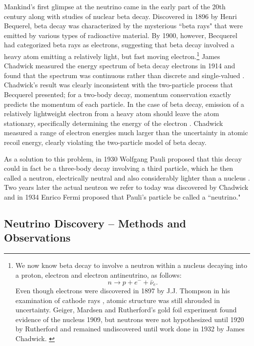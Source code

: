 Mankind's first glimpse at the neutrino came in the early part of the 20th
century along with studies of nuclear beta decay.  Discovered in 1896 by Henri
Bequerel, beta decay was characterized by the mysterious ``beta rays" that were
emitted by various types of radioactive material.  \cite{becquerelBeta}  By
1900, however, Becquerel had categorized beta rays as electrons, suggesting
that beta decay involved a heavy atom emitting a relatively light, but fast
moving electron.\footnote{
We now know beta decay to involve a neutron within a nucleus decaying into a
proton, electron and electron antineutrino, as follows:
\begin{equation*}      n \rightarrow p + e^- + \bar{\nu}_e  . \end{equation*}
Even though electrons were discovered in 1897 by J.J. Thompson in his
examination of cathode rays \cite{thompson}, atomic structure was still
shrouded in uncertainty.  Geiger, Mardsen and Rutherford's gold foil experiment
found evidence of the nucleus 1909, but neutrons were not hypothesized until
1920 by Rutherford \cite{rutherfordNeutron} and remained undiscovered until
work done in 1932 by James Chadwick. \cite{chadwickNeutron}
 } \cite{becquerelElec}
James Chadwick measured the energy spectrum of beta decay electrons in 1914 and
found that the spectrum was continuous rather than discrete and single-valued
\cite {chadwickBeta}.  Chadwick's result was clearly inconsistent with the
two-particle process that Becquerel presented; for a two-body decay, momentum
conservation exactly predicts the momentum of each particle.  In the case of
beta decay, emission of a relatively lightweight electron from a heavy atom
should leave the atom stationary, specifically determining the energy of the
electron .  Chadwick measured a range of electron energies much larger than the
uncertainty in atomic recoil energy, clearly violating the two-particle model
of beta decay.

As a solution to this problem, in 1930 Wolfgang Pauli proposed that this decay
could in fact be a three-body decay involving a third particle, which he then
called a neutron, electrically neutral and also considerably lighter than a
nucleus \cite{pauliNeuProp}.  Two years later the actual neutron we refer to
today was discovered by Chadwick \cite{chadwickNeutron} and in 1934 Enrico
Fermi proposed that Pauli's particle be called a ``neutrino."
\cite{fermiNeuName}

\subsection{Neutrino Discovery -- Methods and Observations}
\label{discovery}


